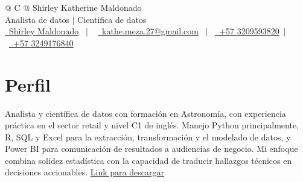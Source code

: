 \documentclass[a4paper, 10pt]{article}
\begin{document}
\pagestyle{empty} 



\begin{tabularx}{\linewidth}{@{} C @{}}
\Huge{Shirley Katherine Maldonado} \\[3pt]
{Analista de datos $|$ Cientifica de datos }\\[2pt]
\href{https://www.linkedin.com/in/katherine-maldonado-64424b205/}{\raisebox{-0.05\height}\faLinkedin\ Shirley Maldonado} \ $|$ \ 
\href{mailto:kathe.meza.27@gmail.com}{\raisebox{-0.05\height}\faEnvelope \ kathe.meza.27@gmail.com} \ $|$ \ 
\href{tel:+57 3209593820}{\raisebox{-0.05\height}\faMobile \ +57 3209593820}\ $|$ \ \href{tel:+57 3209593820}{\raisebox{-0.05\height}\faMobile \ +57 3249176840} \\
\end{tabularx}


\section{Perfil}
Analista y científica de datos con formación en Astronomía, con experiencia práctica en el sector retail y nivel C1 de inglés. Manejo Python principalmente, R, SQL y Excel para la extracción, transformación y el modelado de datos, y Power BI para comunicación de resultados a audiencias de negocio. Mi enfoque combina solidez estadística con la capacidad de traducir hallazgos técnicos en decisiones accionables.
\href{https://kikikath.github.io/Hoja-de-Vida/cv.pdf}{Link para descargar}
\end{document}

